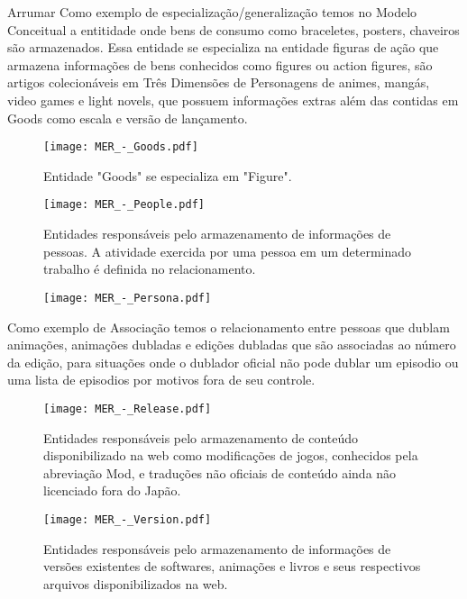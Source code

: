 \documentclass[12pt]{article}
\begin{document}
{Arrumar}
Como exemplo de especialização/generalização temos no Modelo Conceitual a entitidade onde bens de consumo como braceletes, posters, chaveiros são armazenados. Essa entidade se especializa na entidade figuras de ação que armazena informações de bens conhecidos como figures ou action figures, são artigos colecionáveis em Três Dimensões de Personagens de animes, mangás, video games e light novels,
 que possuem informações extras além das contidas em Goods como escala e versão de lançamento.

\begin{figure}[H]
\centering
\texttt{[image: MER\_-\_Goods.pdf]}
\caption{Entidade "Goods" se especializa em "Figure".} \label{hash}
\end{figure}

\begin{figure}[H]
\centering
\texttt{[image: MER\_-\_People.pdf]}
\caption{Entidades responsáveis pelo armazenamento de informações de pessoas. A atividade exercida por uma pessoa em um determinado trabalho é definida no relacionamento.} \label{hash}
\end{figure}

\begin{figure}[H]
\centering
\texttt{[image: MER\_-\_Persona.pdf]}
\caption{} \label{Persona}
\end{figure}


Como exemplo de Associação temos o relacionamento entre pessoas que dublam animações, animações dubladas e edições dubladas que são associadas ao número da edição, para situações onde o dublador oficial não pode dublar um episodio ou uma lista de episodios por motivos fora de seu controle. 

\begin{figure}[H]
\centering
\texttt{[image: MER\_-\_Release.pdf]}
\caption{Entidades responsáveis pelo armazenamento de conteúdo disponibilizado na web como modificações de jogos, conhecidos pela abreviação Mod, e traduções não oficiais de conteúdo ainda não licenciado fora do Japão.} \label{Release}
\end{figure}

\begin{figure}[H]
\centering
\texttt{[image: MER\_-\_Version.pdf]}
\caption{Entidades responsáveis pelo armazenamento de informações de versões existentes de softwares, animações e livros e seus respectivos arquivos disponibilizados na web.} \label{hash}
\end{figure}
\end{document}
